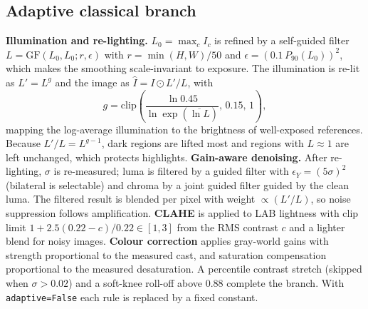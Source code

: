 \documentclass[conference]{IEEEtran}
\begin{document}
\subsection{Adaptive classical branch}
\textbf{Illumination and re-lighting.} $L_0=\max_c I_c$ is refined by a self-guided filter $L=\mathrm{GF}(L_0,L_0;r,\epsilon)$
with $r=\min(H,W)/50$ and $\epsilon=(0.1\,P_{90}(L_0))^2$, which makes the smoothing scale-invariant to exposure. The
illumination is re-lit as $L'=L^{g}$ and the image as $\hat I = I\odot L'/L$, with
\begin{equation}
g=\mathrm{clip}\!\left(\frac{\ln 0.45}{\ln \exp(\overline{\ln L})},\,0.15,\,1\right),
\end{equation}
mapping the log-average illumination to the brightness of well-exposed references. Because $L'/L=L^{g-1}$, dark
regions are lifted most and regions with $L\approx1$ are left unchanged, which protects highlights.
\textbf{Gain-aware denoising.} After re-lighting, $\sigma$ is re-measured; luma is filtered by a guided filter with
$\epsilon_Y=(5\sigma)^2$ (bilateral is selectable) and chroma by a joint guided filter guided by the clean luma. The
filtered result is blended per pixel with weight $\propto (L'/L)$, so noise suppression follows amplification.
\textbf{CLAHE} is applied to LAB lightness with clip limit $1+2.5(0.22-c)/0.22\in[1,3]$ from the RMS contrast $c$
and a lighter blend for noisy images. \textbf{Colour correction} applies gray-world gains with strength proportional
to the measured cast, and saturation compensation proportional to the measured desaturation. A percentile contrast
stretch (skipped when $\sigma>0.02$) and a soft-knee roll-off above 0.88 complete the branch. With
\texttt{adaptive=False} each rule is replaced by a fixed constant.
\end{document}
